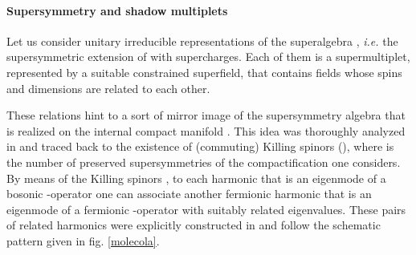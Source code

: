 \documentclass[a4paper,11pt]{article}
\begin{document}
\paragraph{Supersymmetry and shadow multiplets}
Let us consider unitary irreducible representations of the
superalgebra \coordHE{}, {\it i.e.} the supersymmetric
extension of \coordHE{} with \coordHE{} supercharges. Each of them
is a  supermultiplet, represented by a suitable constrained
superfield, that contains fields whose spins \coordHE{} and dimensions
\coordHE{} are related to each other.
\par
These relations hint to a sort of mirror image of the
supersymmetry algebra that is realized on the internal compact
manifold \coordHE{}. This idea was thoroughly analyzed in
\cite{univer} and traced back to the existence of (commuting)
Killing spinors \coordHE{} (\coordHE{}), where \coordHE{}
is the number of preserved supersymmetries of the \coordHE{} compactification one considers. By means of the
Killing spinors \coordHE{}, to each harmonic \coordHE{} that is an
eigenmode of a bosonic \coordHE{}-operator one can associate another
fermionic harmonic \myHighlight{$\Xi$}\coordHE{} that is an eigenmode of a fermionic
\coordHE{}-operator with suitably related eigenvalues. These pairs of
related harmonics were explicitly constructed in \cite{univer} and
follow the schematic pattern given in fig. \ref{molecola}.
\end{document}
